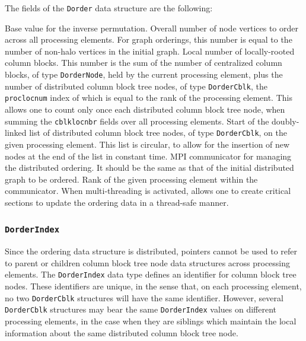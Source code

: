The fields of the \texttt{Dorder} data structure are the following:
\begin{itemize}
  Base value for the inverse permutation.
  Overall number of node vertices to order across all processing
  elements. For graph orderings, this number is equal to the number of
  non-halo vertices in the initial graph.
  Local number of locally-rooted column blocks. This number is the sum
  of the number of centralized column blocks, of type
  \texttt{Dorder\lbt Node}, held by the current processing element,
  plus the number of distributed column block tree nodes, of type
  \texttt{Dorder\lbt Cblk}, the \texttt{proc\lbt loc\lbt num} index of
  which is equal to the rank of the processing element. This allows
  one to count only once each distributed column block tree node, when
  summing the \texttt{cblk\lbt loc\lbt nbr} fields over all
  processing elements.
  Start of the doubly-linked list of distributed column block tree
  nodes, of type \texttt{Dorder\lbt Cblk}, on the given processing
  element. This list is circular, to allow for the insertion of new
  nodes at the end of the list in constant time.
  MPI communicator for managing the distributed ordering. It should be
  the same as that of the initial distributed graph to be ordered.
  Rank of the given processing element within the communicator.
  When multi-threading is activated, allows one to create critical
  sections to update the ordering data in a thread-safe manner.
\end{itemize}

\subsubsection{\texttt{DorderIndex}}
\label{sec-data-dorder-index}

Since the ordering data structure is distributed, pointers cannot be
used to refer to parent or children column block tree node data
structures across processing elements. The \texttt{Dorder\lbt Index}
data type defines an identifier for column block tree nodes. These
identifiers are unique, in the sense that, on each processing element,
no two \texttt{Dorder\lbt Cblk} structures will have the same
identifier. However, several \texttt{Dorder\lbt Cblk} structures may
bear the same \texttt{Dorder\lbt Index} values on different processing
elements, in the case when they are siblings which maintain the local
information about the same distributed column block tree node.

